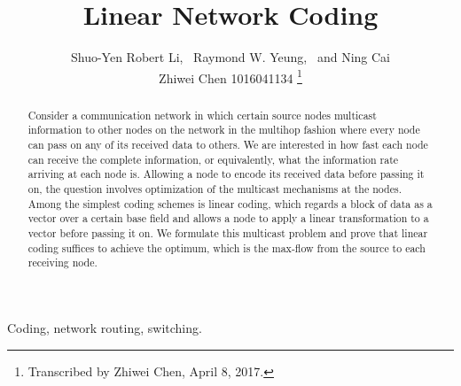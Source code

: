 \documentclass[journal]{IEEEtran}
\begin{document}
\title{Linear Network Coding}
	\author{Shuo-Yen Robert Li,\  Raymond W. Yeung,\  and Ning Cai\\
	Zhiwei Chen 1016041134
	\thanks{Transcribed by Zhiwei Chen, April 8, 2017.}}
\maketitle
	
	\begin{abstract}
		Consider a communication network in which certain source nodes multicast information to other nodes on the network in the multihop fashion where every node can pass on any of its received data to others. We are interested in how fast each node can receive the complete information, or equivalently, what the information rate arriving at each node is. Allowing a node to encode its received data before passing it on, the question involves optimization of the multicast mechanisms at the nodes. Among the simplest coding schemes is linear coding, which regards a block of data as a vector over a certain base field and allows a node to apply a linear transformation to a vector before passing it on. We formulate this multicast problem and prove that linear coding suffices to achieve the optimum, which is the max-flow from the source to each receiving node.
	\end{abstract}
	
	\begin{IEEEkeywords}
			Coding, network routing, switching.
\end{IEEEkeywords}
\IEEEpeerreviewmaketitle
\end{document}
